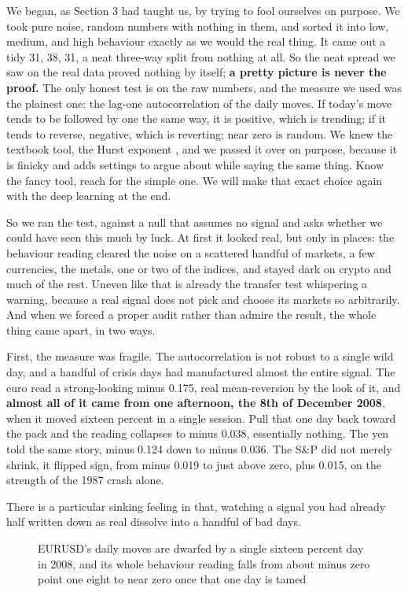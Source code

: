 \documentclass[11pt]{article} %
\begin{document}
We began, as Section 3 had taught us, by trying to fool ourselves on purpose. We took pure noise, random numbers with nothing in them, and sorted it into low, medium, and high behaviour exactly as we would the real thing. It came out a tidy 31, 38, 31, a neat three-way split from nothing at all. So the neat spread we saw on the real data proved nothing by itself; \textbf{a pretty picture is never the proof.} The only honest test is on the raw numbers, and the measure we used was the plainest one: the lag-one autocorrelation of the daily moves. If today's move tends to be followed by one the same way, it is positive, which is trending; if it tends to reverse, negative, which is reverting; near zero is random. We knew the textbook tool, the Hurst exponent \cite{lo:1991}, and we passed it over on purpose, because it is finicky and adds settings to argue about while saying the same thing. Know the fancy tool, reach for the simple one. We will make that exact choice again with the deep learning at the end.

So we ran the test, against a null that assumes no signal and asks whether we could have seen this much by luck. At first it looked real, but only in places: the behaviour reading cleared the noise on a scattered handful of markets, a few currencies, the metals, one or two of the indices, and stayed dark on crypto and much of the rest. Uneven like that is already the transfer test whispering a warning, because a real signal does not pick and choose its markets so arbitrarily. And when we forced a proper audit rather than admire the result, the whole thing came apart, in two ways.

First, the measure was fragile. The autocorrelation is not robust to a single wild day, and a handful of crisis days had manufactured almost the entire signal. The euro read a strong-looking minus 0.175, real mean-reversion by the look of it, and \textbf{almost all of it came from one afternoon, the 8th of December 2008}, when it moved sixteen percent in a single session. Pull that one day back toward the pack and the reading collapses to minus 0.038, essentially nothing. The yen told the same story, minus 0.124 down to minus 0.036. The S\&P did not merely shrink, it flipped sign, from minus 0.019 to just above zero, plus 0.015, on the strength of the 1987 crash alone.

There is a particular sinking feeling in that, watching a signal you had already half written down as real dissolve into a handful of bad days.

\begin{figure}[htbp]
\centering

\caption{EURUSD's daily moves are dwarfed by a single sixteen percent day in 2008, and its whole behaviour reading falls from about minus zero point one eight to near zero once that one day is tamed}
\end{figure}
\end{document}
